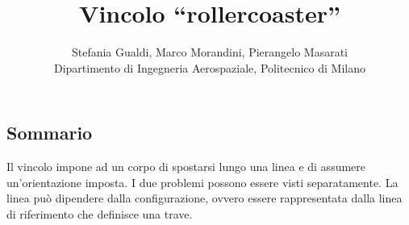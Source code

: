 \documentclass[12pt,dvips,fleqn,italian]{article}
\begin{document}
\title{\textbf{Vincolo ``rollercoaster''}}
\author{Stefania Gualdi, Marco Morandini, Pierangelo Masarati \\
\small Dipartimento di Ingegneria Aerospaziale, Politecnico di Milano}
\date{}
\maketitle

\subsection*{Sommario}
Il vincolo impone ad un corpo di spostarsi lungo una linea e di assumere
un'orientazione imposta.
I due problemi possono essere visti separatamente.
La linea pu\`o dipendere dalla configurazione, ovvero essere rappresentata
dalla linea di riferimento che definisce una trave.
\end{document}
